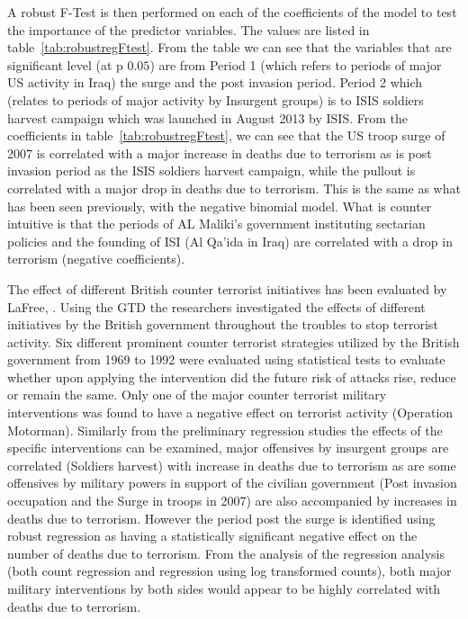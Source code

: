 A robust F-Test is then performed on each of the coefficients of the model to test the importance of the predictor variables. The values are listed in table~\ref{tab:robustregFtest}. From the table we can see that the variables that are significant level (at p $0.05$) are from Period 1 (which refers to periods of major US activity in Iraq) the surge and the post invasion period.  Period 2 which (relates  to periods of major activity by Insurgent groups) is to ISIS soldiers harvest  campaign which was launched in August 2013 by ISIS. From the coefficients in table~\ref{tab:robustregFtest}, we can see that the US troop surge of 2007 is correlated with a major increase in  deaths due to terrorism as is post invasion period as the ISIS soldiers harvest campaign, while the pullout is correlated with a major drop in deaths due to terrorism. This is the same as what has been seen previously, with the negative binomial model. What is counter intuitive is that the periods of AL Maliki's government instituting sectarian policies and the founding of ISI (Al Qa'ida in Iraq) are correlated with a drop in terrorism (negative coefficients). 

The effect of different British counter terrorist initiatives has been evaluated by LaFree, \citep{lafree2009impact}. Using the GTD the researchers investigated the effects of different initiatives by the British government throughout the troubles to stop terrorist activity. Six different prominent counter terrorist strategies utilized by the British government from 1969 to 1992 were evaluated using statistical tests to evaluate whether upon applying the intervention did the future risk of attacks rise, reduce or remain the same. Only one of the major counter terrorist military interventions was found to have a negative effect on terrorist activity (Operation Motorman). Similarly from the preliminary regression studies the effects of the specific interventions can be examined, major offensives by insurgent groups are correlated (Soldiers harvest) with increase in deaths due to terrorism as are some offensives by military powers in support of the civilian government (Post invasion occupation and the Surge in troops in 2007) are also accompanied by increases in deaths due to terrorism. However the period post the surge is identified using robust regression as having a statistically significant negative effect on the number of deaths due to terrorism. From the analysis of the regression analysis (both count regression and regression using log transformed counts), both major military interventions by both sides would appear to be highly correlated with deaths due to terrorism. 



